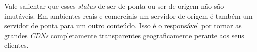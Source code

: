 Vale salientar que esses \textit{status} de ser de ponta ou ser de origem não s\~ao imut\'aveis. Em ambientes reais e comerciais um servidor de origem \'e tamb\'em um servidor de ponta para um outro conte\'udo. Isso \'e o respons\'avel por tornar as grandes \emph{CDNs} completamente transparentes geograficamente perante aos seus clientes.